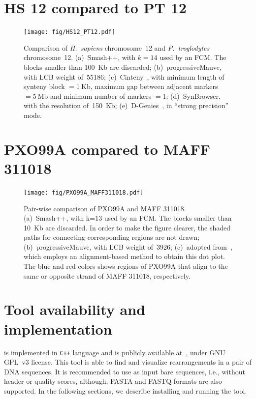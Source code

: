 \documentclass[a4paper,9pt]{extarticle}
\newcommand*{\method}[1]{\text{#1}\xspace}
\newcommand*{\smashpp}   {\method{Smash++}}
\newcommand*{\fasta}     {FASTA\xspace}
\newcommand*{\fastq}     {FASTQ\xspace}
\newcommand*{\mono}[1]{\lstinline|#1|}
\newcommand*{\lang}[1]{\mono{#1}\xspace}
\newcommand*{\cpp}       {\lang{C++}}
\begin{document}
\clearpage
\section{HS 12 compared to PT 12}
\begin{figure}[!h]
  \centering
  \texttt{[image: fig/HS12\_PT12.pdf]}
  \caption{Comparison of \textit{H.~sapiens} chromosome~12 and \textit{P.~troglodytes} chromosome~12.
   (a)~Smash++, with $k=14$ used by an FCM. The blocks smaller than 100~Kb are discarded;
   (b)~progressiveMauve, with LCB weight of~55186;
   (c)~Cinteny~\cite{sinha2007cinteny}, with minimum length of synteny block $=1~$Kb, maximum gap between adjacent markers $=5~$Mb and minimum number of markers $=1$;
   (d)~SynBrowser, with the resolution of~150~Kb;
   (e)~D-Genies~\cite{cabanettes2018d}, in ``strong precision'' mode.
  }
  \label{fig.supp.HS12.PT12}
\end{figure}

\clearpage
\section{PXO99A compared to MAFF 311018}
\begin{figure}[!h]
  \centering
  \texttt{[image: fig/PXO99A\_MAFF311018.pdf]}
    \caption{Pair-wise comparison of PXO99A and MAFF 311018.
     (a)~Smash++, with k=13 used by an FCM. The blocks smaller than 10~Kb are discarded. In order to make the figure clearer, the shaded paths for connecting corresponding regions are not drawn;
     (b)~progressiveMauve, with LCB weight of~3926;
     (c)~adopted from~\cite{salzberg2008genome}, which employs an alignment-based method to obtain this dot plot. The blue and red colors shows regions of PXO99A that align to the same or opposite strand of MAFF 311018, respectively.
    }
    \label{fig.supp.PXO99A.MAFF_311018}
\end{figure}

\clearpage
\section{Tool availability and implementation}
\label{sec.tool}
\smashpp is implemented in \cpp language and is publicly available at~\cite{web-smashpp}, under GNU GPL~v3 license. This tool is able to find and visualize rearrangements in a pair of DNA sequences. It is recommended to use as input bare sequences, i.e., without header or quality scores, although, \fasta and \fastq formats are also supported. In the following sections, we describe installing and running the \smashpp tool.
\end{document}
